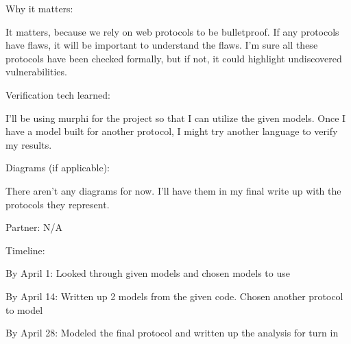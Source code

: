\documentclass[11pt]{article}
\begin{document}
\begin{compactenum}
\begin{minipage}{\minpagw}
{{      Why it matters:
      
      It matters, because we rely on web protocols to be bulletproof. If any protocols have flaws, it will be important to understand the flaws. I'm sure all these protocols have been checked formally, but if not, it could highlight undiscovered vulnerabilities.
      
      Verification tech learned:
      
      I'll be using murphi for the project so that I can utilize the given models. Once I have a model built for another protocol, I might try another language to verify my results.
      
      Diagrams (if applicable):
      
      There aren't any diagrams for now. I'll have them in my final write up with the protocols they represent.
      
      Partner: N/A
      
      Timeline:
      
      By April 1: Looked through given models and chosen models to use
      
      By April 14: Written up 2 models from the given code. Chosen another protocol to model
      
      By April 28: Modeled the final protocol and written up the analysis for turn in
    }%
  }%
\end{minipage}  
  


\end{compactenum}
\end{document}
